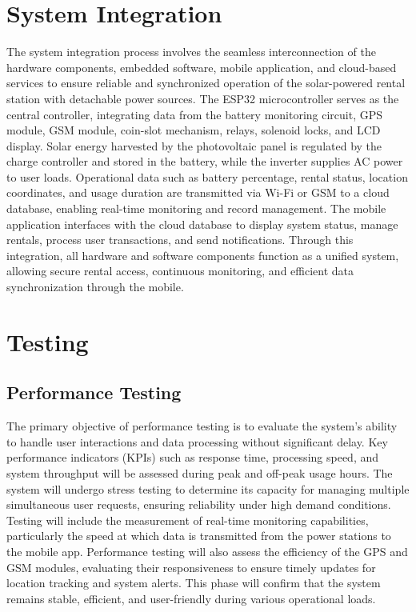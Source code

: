 {\section{System Integration}
The system integration process involves the seamless interconnection of the hardware components, embedded software, mobile application, and cloud-based services to ensure reliable and synchronized operation of the solar-powered rental station with detachable power sources. The ESP32 microcontroller serves as the central controller, integrating data from the battery monitoring circuit, GPS module, GSM module, coin-slot mechanism, relays, solenoid locks, and LCD display. Solar energy harvested by the photovoltaic panel is regulated by the charge controller and stored in the   battery, while the inverter supplies AC power to user loads. Operational data such as battery percentage, rental status, location coordinates, and usage duration are transmitted via Wi-Fi or GSM to a cloud database, enabling real-time monitoring and record management. The mobile application interfaces with the cloud database to display system status, manage rentals, process user transactions, and send notifications. Through this integration, all hardware and software components function as a unified system, allowing secure rental access, continuous monitoring, and efficient data synchronization through the mobile.

\section{Testing}
\subsection{Performance Testing}
The primary objective of performance testing is to evaluate the system's ability to handle user interactions and data processing without significant delay. Key performance indicators (KPIs) such as response time, processing speed, and system throughput will be assessed during peak and off-peak usage hours. The system will undergo stress testing to determine its capacity for managing multiple simultaneous user requests, ensuring reliability under high demand conditions.
Testing will include the measurement of real-time monitoring capabilities, particularly the speed at which data is transmitted from the power stations to the mobile app. Performance testing will also assess the efficiency of the GPS and GSM modules, evaluating their responsiveness to ensure timely updates for location tracking and system alerts. This phase will confirm that the system remains stable, efficient, and user-friendly during various operational loads.

}
